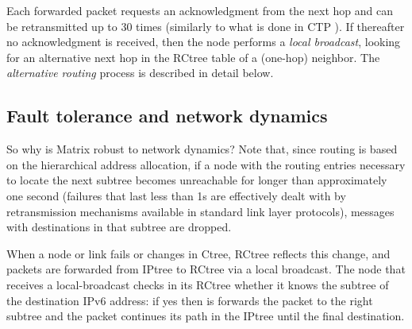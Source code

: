 Each forwarded packet requests an acknowledgment from the next hop and can be
retransmitted up to 30 times (similarly to what is done in CTP
\cite{Fonseca:2009}). If thereafter no acknowledgment
is received, then the node performs a \textit{local broadcast}, looking for an
alternative next hop in the RCtree table of a (one-hop) neighbor. The
\textit{alternative routing} process is described in detail below.


\subsection{Fault tolerance and network dynamics}
\label{subsec:localBroadcast}

So why is Matrix robust to network dynamics? Note that, since
routing is based on the hierarchical address allocation, if a node
with the routing entries necessary to locate the next subtree
becomes unreachable for longer than approximately one second
(failures that last less than 1s are effectively dealt with by
retransmission mechanisms available in standard link layer
protocols), messages with destinations in that subtree are dropped.

When a node or link fails or changes in Ctree, RCtree reflects this
change, and packets are forwarded from IPtree to RCtree via a local
broadcast. The node that receives a local-broadcast checks in its
RCtree whether it knows the subtree of the destination IPv6 address:
if yes then is forwards the packet to the right subtree and the
packet continues its path in the IPtree until the final destination.


